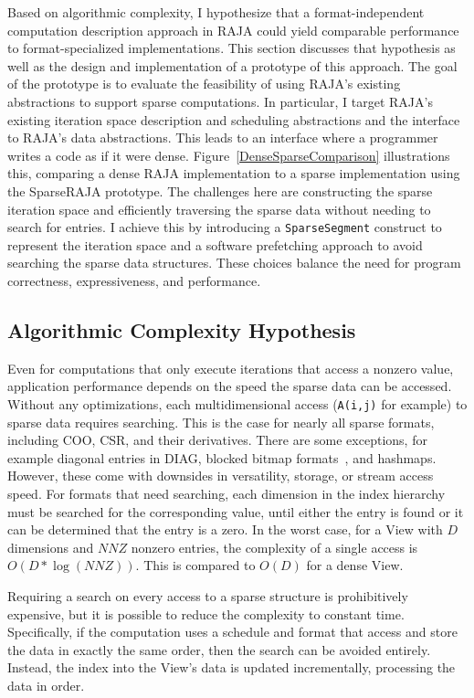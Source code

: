 Based on algorithmic complexity, I hypothesize that a format-independent computation description approach in RAJA could yield comparable performance to format-specialized implementations.
This section discusses that hypothesis as well as the design and implementation of a prototype of this approach.
The goal of the prototype is to evaluate the feasibility of using RAJA's existing abstractions to support sparse computations.
In particular, I target RAJA's existing iteration space description and scheduling abstractions and the interface to RAJA's data abstractions.
This leads to an interface where a programmer writes a code as if it were dense.
Figure~\ref{DenseSparseComparison} illustrations this, comparing a dense RAJA implementation to a sparse implementation using the SparseRAJA prototype.
The challenges here are constructing the sparse iteration space and efficiently traversing the sparse data without needing to search for entries.
I achieve this by introducing a \verb.SparseSegment. construct to represent the iteration space and a software prefetching approach to avoid searching the sparse data structures.
These choices balance the need for program correctness, expressiveness, and performance.

\subsection{Algorithmic Complexity Hypothesis}
Even for computations that only execute iterations that access a nonzero value, application performance depends on the speed the sparse data can be accessed.
Without any optimizations, each multidimensional access (\verb.A(i,j). for example) to sparse data requires searching. 
This is the case for nearly all sparse formats, including COO, CSR, and their derivatives.
There are some exceptions, for example diagonal entries in DIAG, blocked bitmap formats~\cite{kannan2013efficient}, and hashmaps.
However, these come with downsides in versatility, storage, or stream access speed.
For formats that need searching, each dimension in the index hierarchy must be searched for the corresponding value, until either the entry is found or it can be determined that the entry is a zero.
In the worst case, for a View with $D$ dimensions and $NNZ$ nonzero entries, the complexity of a single access is $O(D * \log(NNZ))$. 
This is compared to $O(D)$ for a dense View.

Requiring a search on every access to a sparse structure is prohibitively expensive, but it is possible to reduce the complexity to constant time.
Specifically, if the computation uses a schedule and format that access and store the data in exactly the same order, then the search can be avoided entirely.
Instead, the index into the View's data is updated incrementally, processing the data in order.

